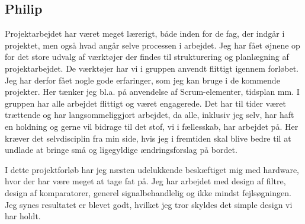 \subsection{Philip}
Projektarbejdet har været meget lærerigt, både inden for de fag, der indgår i projektet, men også hvad angår selve processen i arbejdet. Jeg har fået øjnene op for det store udvalg af værktøjer der findes til strukturering og planlægning af projektarbejdet. De værktøjer har vi i gruppen anvendt flittigt igennem forløbet. Jeg har derfor fået nogle gode erfaringer, som jeg kan bruge i de kommende projekter. Her tænker jeg bl.a. på anvendelse af Scrum-elementer, tidsplan mm.
I gruppen har alle arbejdet flittigt og været engagerede. Det har til tider været trættende og har langsommeliggjort arbejdet, da alle, inklusiv jeg selv, har haft en holdning og gerne vil bidrage til det stof, vi i fællesskab, har arbejdet på. Her kræver det selvdisciplin fra min side, hvis jeg i fremtiden skal blive bedre til at undlade at bringe små og ligegyldige ændringsforslag på bordet.

I dette projektforløb har jeg næsten udelukkende beskæftiget mig med hardware, hvor der har være meget at tage fat på. Jeg har arbejdet med design af filtre, design af komparatorer, generel signalbehandlelig og ikke mindst fejlsøgningen. Jeg synes resultatet er blevet godt, hvilket jeg tror skyldes det simple design vi har holdt.